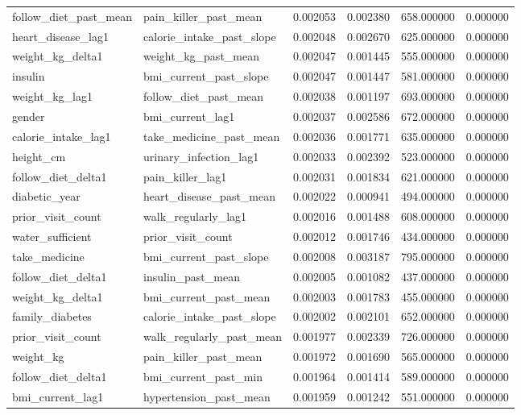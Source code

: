 \begin{longtable}{llrrrr}
follow\_diet\_past\_mean & pain\_killer\_past\_mean & 0.002053 & 0.002380 & 658.000000 & 0.000000 \\
heart\_disease\_lag1 & calorie\_intake\_past\_slope & 0.002048 & 0.002670 & 625.000000 & 0.000000 \\
weight\_kg\_delta1 & weight\_kg\_past\_mean & 0.002047 & 0.001445 & 555.000000 & 0.000000 \\
insulin & bmi\_current\_past\_slope & 0.002047 & 0.001447 & 581.000000 & 0.000000 \\
weight\_kg\_lag1 & follow\_diet\_past\_mean & 0.002038 & 0.001197 & 693.000000 & 0.000000 \\
gender & bmi\_current\_lag1 & 0.002037 & 0.002586 & 672.000000 & 0.000000 \\
calorie\_intake\_lag1 & take\_medicine\_past\_mean & 0.002036 & 0.001771 & 635.000000 & 0.000000 \\
height\_cm & urinary\_infection\_lag1 & 0.002033 & 0.002392 & 523.000000 & 0.000000 \\
follow\_diet\_delta1 & pain\_killer\_lag1 & 0.002031 & 0.001834 & 621.000000 & 0.000000 \\
diabetic\_year & heart\_disease\_past\_mean & 0.002022 & 0.000941 & 494.000000 & 0.000000 \\
prior\_visit\_count & walk\_regularly\_lag1 & 0.002016 & 0.001488 & 608.000000 & 0.000000 \\
water\_sufficient & prior\_visit\_count & 0.002012 & 0.001746 & 434.000000 & 0.000000 \\
take\_medicine & bmi\_current\_past\_slope & 0.002008 & 0.003187 & 795.000000 & 0.000000 \\
follow\_diet\_delta1 & insulin\_past\_mean & 0.002005 & 0.001082 & 437.000000 & 0.000000 \\
weight\_kg\_delta1 & bmi\_current\_past\_mean & 0.002003 & 0.001783 & 455.000000 & 0.000000 \\
family\_diabetes & calorie\_intake\_past\_slope & 0.002002 & 0.002101 & 652.000000 & 0.000000 \\
prior\_visit\_count & walk\_regularly\_past\_mean & 0.001977 & 0.002339 & 726.000000 & 0.000000 \\
weight\_kg & pain\_killer\_past\_mean & 0.001972 & 0.001690 & 565.000000 & 0.000000 \\
follow\_diet\_delta1 & bmi\_current\_past\_min & 0.001964 & 0.001414 & 589.000000 & 0.000000 \\
bmi\_current\_lag1 & hypertension\_past\_mean & 0.001959 & 0.001242 & 551.000000 & 0.000000 \\

\end{longtable}

